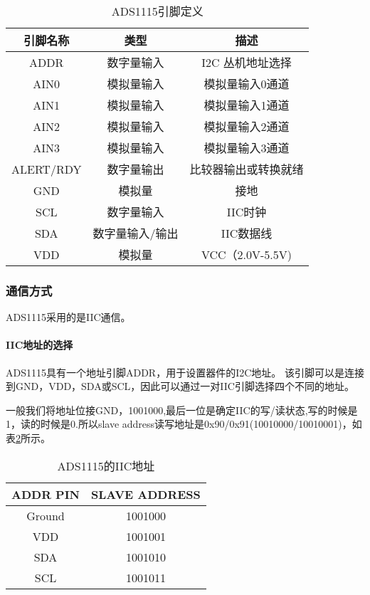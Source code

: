 \documentclass[lang=cn,11pt,a4paper]{elegantpaper}
\begin{document}
\begin{table}[!ht]
  \centering
  \caption{ADS1115引脚定义}
  \begin{tabular}{ccc}
    \textbf{引脚名称} & \textbf{类型} & \textbf{描述 }   \\ \hline
    ADDR          & 数字量输入       & I2C 丛机地址选择     \\
    AIN0          & 模拟量输入       & 模拟量输入0通道       \\
    AIN1          & 模拟量输入       & 模拟量输入1通道       \\
    AIN2          & 模拟量输入       & 模拟量输入2通道       \\
    AIN3          & 模拟量输入       & 模拟量输入3通道       \\
    ALERT/RDY     & 数字量输出       & 比较器输出或转换就绪     \\
    GND           & 模拟量         & 接地             \\
    SCL           & 数字量输入       & IIC时钟          \\
    SDA           & 数字量输入/输出    & IIC数据线         \\
    VDD           & 模拟量         & VCC（2.0V-5.5V) \\
  \end{tabular}
  \label{tab:ADS1115引脚定义}
\end{table}

\subsubsection{通信方式}
ADS1115采用的是IIC通信。
\paragraph{IIC地址的选择}
ADS1115具有一个地址引脚ADDR，用于设置器件的I2C地址。 该引脚可以是连接到GND，VDD，SDA或SCL，因此可以通过一对IIC引脚选择四个不同的地址。

一般我们将地址位接GND，1001000,最后一位是确定IIC的写/读状态,写的时候是1，读的时候是0.所以slave address读写地址是0x90/0x91(10010000/10010001)，如表\ref{tab:IIC}所示。

\begin{table}[!ht]
  \centering
  \caption{ADS1115的IIC地址}
  \begin{tabular}{cc}
    \textbf{ADDR PIN} & \textbf{SLAVE ADDRESS } \\ \hline
    Ground            & 1001000                 \\
    VDD               & 1001001                 \\
    SDA               & 1001010                 \\
    SCL               & 1001011                 \\
  \end{tabular}
  \label{tab:IIC}
\end{table}
\end{document}
